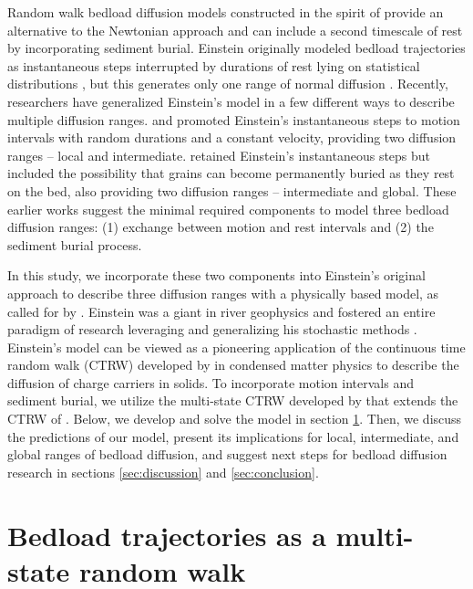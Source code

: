 Random walk bedload diffusion models constructed in the spirit of \citet{Einstein1937} provide an alternative to the Newtonian approach and can include a second timescale of rest by incorporating sediment burial.
Einstein originally modeled bedload trajectories as instantaneous steps interrupted by durations of rest lying on statistical distributions \citep{Hassan1991}, but this generates only one range of normal diffusion \citep{Einstein1937,Hubbell1964,Nakagawa1976}.
Recently, researchers have generalized Einstein's model in a few different ways to describe multiple diffusion ranges.
\citet{Lisle1998} and \citet{Lajeunesse2018} promoted Einstein's instantaneous steps to motion intervals with random durations and a constant velocity, providing two diffusion ranges -- local and intermediate.
\citet{Wu2019} retained Einstein's instantaneous steps but included the possibility that grains can become permanently buried as they rest on the bed, also providing two diffusion ranges -- intermediate and global. 
These earlier works suggest the minimal required components to model three bedload diffusion ranges: (1) exchange between motion and rest intervals and (2) the sediment burial process.

In this study, we incorporate these two components into Einstein's original approach to describe three diffusion ranges with a physically based model, as called for by \citet{Nikora2002}.
Einstein was a giant in river geophysics and fostered an entire paradigm of research leveraging and generalizing his stochastic methods \citep{Hubbell1964, Yano1969, Yang1971, Gordon1972, Nakagawa1976,Paintal1971}.
Einstein's model can be viewed as a pioneering application of the continuous time random walk (CTRW) developed by \citet{Montroll1965} in condensed matter physics to describe the diffusion of charge carriers in solids.
To incorporate motion intervals and sediment burial, we utilize the multi-state CTRW developed by \citet{Weiss1976, Weiss1994} that extends the CTRW of \citet{Montroll1965}.
Below, we develop and solve the model in section \ref{sec:model}. Then, we discuss the predictions of our model, present its implications for local, intermediate, and global ranges of bedload diffusion, and suggest next steps for bedload diffusion research in sections \ref{sec:discussion} and \ref{sec:conclusion}.

\section{Bedload trajectories as a multi-state random walk}
\label{sec:model}
